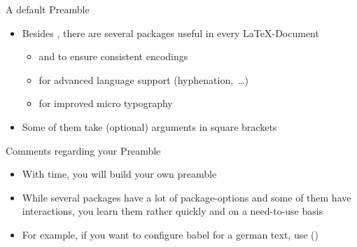 \begin{frame}{A default Preamble}
   \begin{itemize}
      \item Besides , there are several packages useful in every \LaTeX-Document
      \begin{itemize}
         \item {} and  to ensure consistent encodings
         \item {} for advanced language support (hyphenation,~\ldots)
         \item {} for improved micro typography
      \end{itemize}
      \item Some of them take (optional) arguments in square brackets
   \end{itemize}
\end{frame}

\begin{frame}{Comments regarding your Preamble}
   \begin{itemize}
      \itemsep10pt
      \item With time, you will build your own preamble
      \item While several packages have a lot of package-options and some of them have interactions, you learn them rather quickly and on a need-to-use basis
      \item For example, if you want to configure babel for a german text, use  ()
   \end{itemize}
\end{frame}
